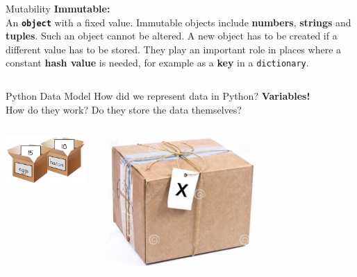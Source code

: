     \begin{frame}{Mutability}
        \huge
        \textbf{Immutable:}\\
        \LARGE
        An \texttt{\textbf{object}} with a fixed value.
        \pause
         Immutable objects include \textbf{numbers}, \textbf{strings} and \textbf{tuples}. Such an object cannot be altered.
        \pause
         A new object has to be created if a different value has to be stored.
        \pause
         They play an important role in places where a constant \textbf{hash value} is needed, for example as a \textbf{key} in a \texttt{dictionary}.
        \pause
        \inputminted[frame=single,framesep=2pt]{python3}{code-examples/value_update.py}
    \end{frame}

    \begin{frame}{Python Data Model}
        \pause
        \LARGE
        How did we represent data in Python?
        \pause
         \textbf{Variables!}\\
        \pause
        How do they work?
        \pause
         Do they store the data themselves?
        \pause
        \begin{columns}
            \begin{column}{0.5\textwidth}
                \includegraphics[width=0.9\textwidth]{images/box.jpg}
            \end{column}
            \pause
            \begin{column}{0.5\textwidth}
                \includegraphics[width=0.6\textwidth]{images/box_tag.jpg}
            \end{column}
        \end{columns}
        
    \end{frame}

